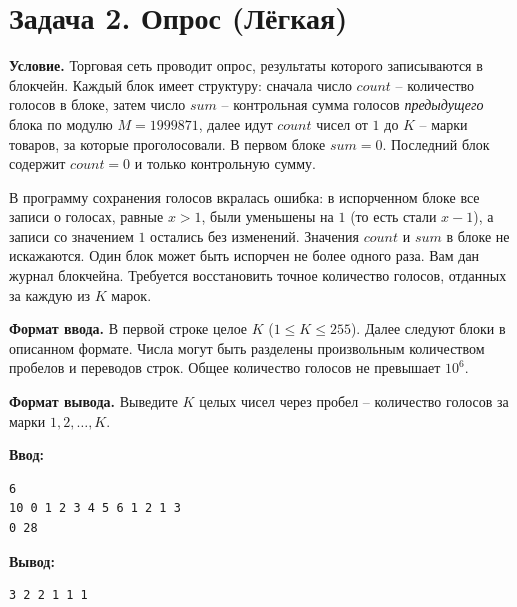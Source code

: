 \section*{Задача 2. Опрос (Лёгкая)}
\textbf{Условие.} Торговая сеть проводит опрос, результаты которого записываются в блокчейн. Каждый блок имеет структуру: сначала число $count$ -- количество голосов в блоке, затем число $sum$ -- контрольная сумма голосов \textit{предыдущего} блока по модулю $M = 1999871$, далее идут $count$ чисел от $1$ до $K$ -- марки товаров, за которые проголосовали. В первом блоке $sum = 0$. Последний блок содержит $count = 0$ и только контрольную сумму.

В программу сохранения голосов вкралась ошибка: в испорченном блоке все записи о голосах, равные $x > 1$, были уменьшены на $1$ (то есть стали $x-1$), а записи со значением $1$ остались без изменений. Значения $count$ и $sum$ в блоке не искажаются. Один блок может быть испорчен не более одного раза. Вам дан журнал блокчейна. Требуется восстановить точное количество голосов, отданных за каждую из $K$ марок.

\textbf{Формат ввода.} В первой строке целое $K$ ($1 \le K \le 255$). Далее следуют блоки в описанном формате. Числа могут быть разделены произвольным количеством пробелов и переводов строк. Общее количество голосов не превышает $10^6$.

\textbf{Формат вывода.} Выведите $K$ целых чисел через пробел -- количество голосов за марки $1, 2, \dots, K$.

\begin{examplebox}
  \begin{minipage}[t]{0.48\linewidth}
    \textbf{Ввод:}\\
    \begin{verbatim}
6
10 0 1 2 3 4 5 6 1 2 1 3
0 28
    \end{verbatim}
  \end{minipage}%
  \hfill%
  \begin{minipage}[t]{0.48\linewidth}
    \textbf{Вывод:}\\
    \begin{verbatim}
3 2 2 1 1 1
    \end{verbatim}
  \end{minipage}
\end{examplebox}